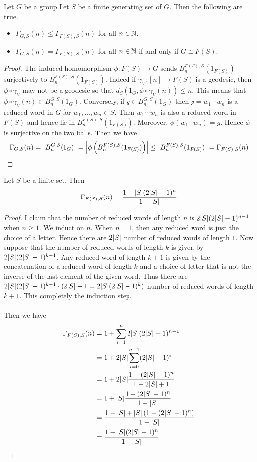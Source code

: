 \documentclass[a4paper]{article}
\begin{document}
\begin{lmm}{}{} Let $G$ be a group Let $S$ be a finite generating set of $G$. Then the following are true. 
\begin{itemize}
\item $\Gamma_{G,S}(n)\leq\Gamma_{F(S),S}(n)$ for all $n\in\mathbb{N}$. 
\item $\Gamma_{G,S}(n)=\Gamma_{F(S),S}(n)$ for all $n\in\mathbb{N}$ if and only if $G\cong F(S)$. 
\end{itemize} \tcbline
\begin{proof}
The induced homomorphism $\phi:F(S)\to G$ sends $B_n^{F(S),S}(1_{F(S)})$ surjectively to $B_n^{F(S),S}(1_{F(S)})$. Indeed if $\gamma_V:[n]\to F(S)$ is a geodesic, then $\phi\circ\gamma_V$ may not be a geodesic so that $d_S(1_G,\phi\circ\gamma_V(n))\leq n$. This means that $\phi\circ\gamma_V(n)\in B_n^{G,S}(1_G)$. Conversely, if $g\in B_n^{G,S}(1_G)$ then $g=w_1\cdots w_n$ is a reduced word in $G$ for $w_1,\dots,w_n\in S$. Then $w_1\cdots w_n$ is also a reduced word in $F(S)$ and hence lie in $B_n^{F(S),S}(1_{F(S)})$. Moreover, $\phi(w_1\cdots w_n)=g$. Hence $\phi$ is surjective on the two balls. Then we have $$\Gamma_{G,S}(n)=\abs{B_n^{G,S}(1_G)}=\abs{\phi\left(B_n^{F(S),S}(1_{F(S)})\right)}\leq\abs{B_n^{F(S),S}(1_{F(S)})}=\Gamma_{F(S),S}(n)$$
\end{proof}
\end{lmm}

\begin{lmm}{}{} Let $S$ be a finite set. Then $$\Gamma_{F(S),S}(n)=\frac{1-\abs{S}(2\abs{S}-1)^n}{1-\abs{S}}$$ \tcbline
\begin{proof}
I claim that the number of reduced words of length $n$ is $2\abs{S}(2\abs{S}-1)^{n-1}$ when $n\geq 1$. We induct on $n$. When $n=1$, then any reduced word is just the choice of a letter. Hence there are $2\abs{S}$ number of reduced words of length $1$. Now suppose that the number of reduced words of length $k$ is given by $2\abs{S}(2\abs{S}-1)^{k-1}$. Any reduced word of length $k+1$ is given by the concatenation of a reduced word of length $k$ and a choice of letter that is not the inverse of the last element of the given word. Thus there are $2\abs{S}(2\abs{S}-1)^{k-1}\cdot(2\abs{S}-1=2\abs{S}(2\abs{S}-1)^k)$ number of reduced words of length $k+1$. This completely the induction step. \\~\\

Then we have 
\begin{align*}
\Gamma_{F(S),S}(n)&=1+\sum_{i=1}^n2\abs{S}(2\abs{S}-1)^{n-1}\\
&=1+2\abs{S}\sum_{i=0}^{n-1}(2\abs{S}-1)^i\\
&=1+2\abs{S}\frac{1-(2\abs{S}-1)^n}{1-2\abs{S}+1}\\
&=1+\abs{S}\frac{1-(2\abs{S}-1)^n}{1-\abs{S}}\\
&=\frac{1-\abs{S}+\abs{S}\left(1-(2\abs{S}-1)^n\right)}{1-\abs{S}}\\
&=\frac{1-\abs{S}(2\abs{S}-1)^n}{1-\abs{S}}
\end{align*}
\end{proof}
\end{lmm}
\end{document}
